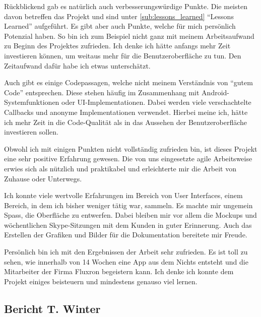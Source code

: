 Rückblickend gab es natürlich auch verbesserungswürdige Punkte. Die meisten davon betreffen das Projekt und sind unter \ref{sub:lessons_learned} \enquote{Lessons Learned} aufgeführt. Es gibt aber auch Punkte, welche für mich persönlich Potenzial haben. So bin ich zum Beispiel nicht ganz mit meinem Arbeitsaufwand zu Beginn des Projektes zufrieden. Ich denke ich hätte anfangs mehr Zeit investieren können, um weitaus mehr für die Benutzeroberfläche zu tun. Den Zeitaufwand dafür habe ich etwas unterschätzt.

Auch gibt es einige Codepassagen, welche nicht meinem Verständnis von \enquote{gutem Code} entsprechen. Diese stehen häufig im Zusammenhang mit Android-Systemfunktionen oder UI-Implementationen. Dabei werden viele verschachtelte Callbacks und anonyme Implementationen verwendet. Hierbei meine ich, hätte ich mehr Zeit in die Code-Qualität als in das Aussehen der Benutzeroberfläche investieren sollen.

Obwohl ich mit einigen Punkten nicht vollständig zufrieden bin, ist dieses Projekt eine sehr positive Erfahrung gewesen. Die von uns eingesetzte agile Arbeitsweise erwies sich als nützlich und praktikabel und erleichterte mir die Arbeit von Zuhause oder Unterwegs.

Ich konnte viele wertvolle Erfahrungen im Bereich von User Interfaces, einem Bereich, in dem ich bisher weniger tätig war, sammeln. Es machte mir ungemein Spass, die Oberfläche zu entwerfen. Dabei bleiben mir vor allem die Mockups und wöchentlichen Skype-Sitzungen mit dem Kunden in guter Erinnerung. Auch das Erstellen der Grafiken und Bilder für die Dokumentation bereitete mir Freude.

Persönlich bin ich mit den Ergebnissen der Arbeit sehr zufrieden. Es ist toll zu sehen, wie innerhalb von 14 Wochen eine App aus dem Nichts entsteht und die Mitarbeiter der Firma Fluxron begeistern kann. Ich denke ich konnte dem Projekt einiges beisteuern und mindestens genauso viel lernen.

\subsection{Bericht T. Winter}

